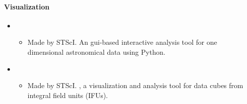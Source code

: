 \documentclass[letterpaper,10pt,english]{sphinxmanual}
\begin{document}
\paragraph{Visualization}
\label{\detokenize{resource/astro/topics/spectroscopy:visualization}}\begin{itemize}
\item {} 
\begin{itemize}
\item {} 
Made by STScI. An gui-based interactive analysis tool for one
dimensional astronomical data using Python.

\end{itemize}

\item {} 
\begin{itemize}
\item {} 
Made by STScI. , a visualization and analysis tool for
data cubes from integral field units (IFUs). 

\end{itemize}

\end{itemize}
\end{document}
